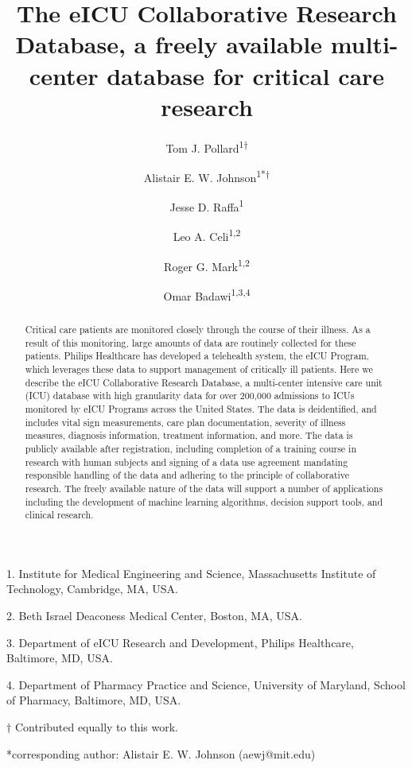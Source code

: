 \documentclass[english]{article}
\begin{document}
\title{The eICU Collaborative Research Database, a freely available multi-center database for critical care research}

\author{Tom J. Pollard\textsuperscript{1{$\dagger$}}
\and Alistair E. W. Johnson\textsuperscript{1{*}{$\dagger$}}
\and Jesse D. Raffa\textsuperscript{1}
\and Leo A. Celi\textsuperscript{1,2}
\and Roger G. Mark\textsuperscript{1,2}
\and Omar Badawi\textsuperscript{1,3,4}}

\maketitle
\thispagestyle{fancy}

1. Institute for Medical Engineering and Science, Massachusetts Institute of Technology, Cambridge, MA, USA.

2. Beth Israel Deaconess Medical Center, Boston, MA, USA.

3. Department of eICU Research and Development, Philips Healthcare, Baltimore, MD, USA.

4. Department of Pharmacy Practice and Science, University of Maryland, School of Pharmacy, Baltimore, MD, USA.

{$\dagger$} Contributed equally to this work.


{*}corresponding author:
Alistair E. W. Johnson (aewj@mit.edu)
\begin{abstract}
Critical care patients are monitored closely through the course of their illness. As a result of this monitoring, large amounts of data are routinely collected for these patients.
Philips Healthcare has developed a telehealth system, the eICU Program, which leverages these data to support management of critically ill patients.
Here we describe the eICU Collaborative Research Database, a multi-center intensive care unit (ICU) database with high granularity data for over 200,000 admissions to ICUs monitored by eICU Programs across the United States.
The data is deidentified, and includes vital sign measurements, care plan documentation, severity of illness measures, diagnosis information, treatment information, and more.
The data is publicly available after registration, including completion of a training course in research with human subjects and signing of a data use agreement mandating responsible handling of the data and adhering to the principle of collaborative research.
The freely available nature of the data will support a number of applications including the development of machine learning algorithms, decision support tools, and clinical research.
\end{abstract}
\end{document}
